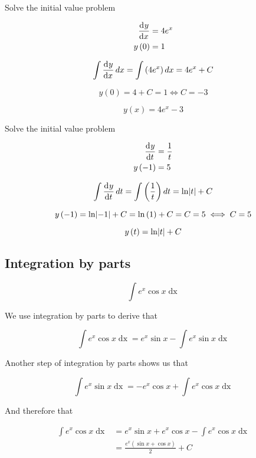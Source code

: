 \documentclass[a4paper, titlepage]{article}
\begin{document}
\begin{Exercise}

Solve the initial value problem

    \begin{align*}
        \dod{y}{x} &= 4e^x \\
        y \left( 0 \right) &= 1
    \end{align*}
    \cite{anton-bivens-davis}
\end{Exercise}

\begin{Answer}
	\[\int \dod{y}{x} dx = \int \left( 4e^x \right) dx = 4e^x + C\]

    \[y \left( 0 \right) = 4 + C = 1 \iff C = -3\]

    \[y \left( x \right) = 4e^x - 3\]
\end{Answer}

\begin{Exercise}

Solve the initial value problem

    \begin{align*}
        \dod{y}{t} &= \frac{1}{t} \\
        y \left( -1 \right) &= 5
    \end{align*}
    \cite{anton-bivens-davis}
\end{Exercise}

\begin{Answer}
	\[\int \dod{y}{t} dt = \int \left( \frac{1}{t} \right) dt = \ln \abs{t} + C\]

    \[y \left( -1 \right) = \ln \abs{-1} + C = \ln \left( 1 \right) + C = C = 5 \iff C = 5\]

    \[y \left( t \right) = \ln \abs{t} + C\]
\end{Answer}

\subsection{Integration by parts}

\begin{Exercise}
\[\int e^x \cos x \mathop{dx}\]
\end{Exercise}

\begin{Answer}

We use integration by parts to derive that

\[\int e^x \cos x \mathop{dx}
  = e^x \sin x - \int e^x \sin x \mathop{dx}\]

Another step of integration by parts shows us that

    \[\int e^x \sin x \mathop{dx} = - e^x \cos x + \int e^x \cos x \mathop{dx}\]

And therefore that

\begin{align*}
\int e^x \cos x \mathop{dx} &= e^x \sin x + e^x \cos x - \int e^x \cos x \mathop{dx} \\
 &= \frac{e^x \left(\sin x + \cos x \right)}{2} + C
\end{align*}
\end{Answer}

\printbibliography
\end{document}
